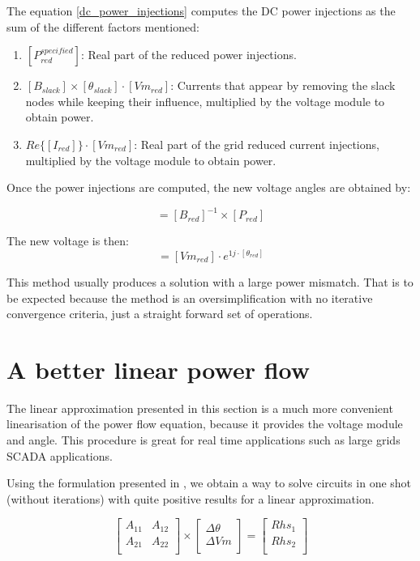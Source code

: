 \documentclass[nols,a4paper,twoside,symmetric,notoc,fleqn]{tufte-book}
\begin{document}
The equation \ref{dc_power_injections} computes the DC power injections as the sum of the different factors mentioned:

\begin{enumerate}
	\item $[P^{specified}_{red}]$: Real part of the reduced power injections.
	\item $[{B}_{slack}] \times [{\theta}_{slack}] \cdot [Vm_{red}]$: Currents that appear by removing the slack nodes while keeping their influence, multiplied by the voltage module to obtain power.
	\item $Re \{ [I_{red}] \}  \cdot [Vm_{red}]$: Real part of the grid reduced current injections, multiplied by the voltage module to obtain power.
\end{enumerate}

Once the power injections are computed, the new voltage angles are obtained by:

\begin{equation}
[\theta_{red}] = [B_{red}]^{-1} \times [P_{red}]
\end{equation}

The new voltage is then:
\begin{equation}
[{V}_{red}] = [{Vm}_{red}] \cdot e^{1j \cdot  [\theta_{red}]}
\end{equation}

This method usually produces a solution with a large power mismatch. That is to be expected because the method is an oversimplification with no iterative convergence criteria, just a straight forward set of operations.


\section{A better linear power flow} \label{ACPF}

The linear approximation presented in this section is a much more convenient linearisation of the power flow equation, because it provides the voltage module and angle. This procedure is great for real time applications such as large grids SCADA applications.

Using the formulation presented in \cite{rossoni2016linearized}, we obtain a way to solve circuits in one shot (without iterations) with quite positive results for a linear approximation.

\begin{equation}
\begin{bmatrix}
A_{11} & A_{12} \\
A_{21} & A_{22} \\
\end{bmatrix}
\times
\begin{bmatrix}
\Delta \theta\\
\Delta Vm\\
\end{bmatrix}
=
\begin{bmatrix}
Rhs_1\\
Rhs_2\\
\end{bmatrix}
\label{eq:AC_linear_power_flow}
\end{equation}
\end{document}
